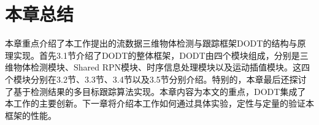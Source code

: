 \section{本章总结}
\label{metho_conclusion}
本章重点介绍了本工作提出的流数据三维物体检测与跟踪框架DODT的结构与原理实现。首先3.1节介绍了DODT的整体框架，DODT由四个模块组成，分别是三维物体检测模块、Shared RPN模块、时序信息处理模块以及运动插值模块。这四个模块分别在3.2节、3.3节、3.4节以及3.5节分别介绍。特别的，本章最后还探讨了基于检测结果的多目标跟踪算法实现。本章内容为本文的重点，DODT集成了本工作的主要创新。下一章将介绍本工作如何通过具体实验，定性与定量的验证本框架的性能。

\ifprint
\newpage
\thispagestyle{empty}
\mbox{}

\clearpage
\setcounter{page}{10}
\fi